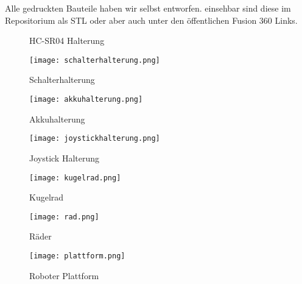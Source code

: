 \documentclass{article}
\begin{document}
Alle gedruckten Bauteile haben wir selbst entworfen. einsehbar sind diese im Repositorium als STL oder aber auch unter den öffentlichen Fusion 360 Links.
\newline
\begin{figure}[h]
	\centering 
\caption{HC-SR04 Halterung} 

        \begin{minipage}[t]{0.48\textwidth}
                \texttt{[image: schalterhalterung.png]}
                \caption{Schalterhalterung \cite{Schalterhalterung}}
        \end{minipage}\hfill
        \begin{minipage}[t]{0.48\textwidth}
                \texttt{[image: akkuhalterung.png]}
                \caption{Akkuhalterung \cite{Akkuhalterung}}
        \end{minipage} 
\end{figure}


\begin{figure}
        \centering
        \begin{minipage}[t]{0.48\textwidth}
                \texttt{[image: joystickhalterung.png]}
                \caption{Joystick Halterung \cite{Joystick_Halterung}}
        \end{minipage}\hfill
        \begin{minipage}[t]{0.48\textwidth}
                \texttt{[image: kugelrad.png]}
                \caption{Kugelrad \cite{Kugelrad}}
        \end{minipage}
        \medskip

        \begin{minipage}[t]{0.48\textwidth}
                \texttt{[image: rad.png]}
                \caption{Räder \cite{Raeder}}
        \end{minipage}\hfill
        \begin{minipage}[t]{0.48\textwidth}
                \texttt{[image: plattform.png]}
                \caption{Roboter Plattform \cite{Plattform}}
        \end{minipage}
       
\end{figure}

\newpage
\end{document}
